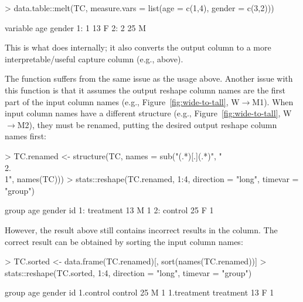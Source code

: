 \begin{Schunk}
\begin{Sinput}
> data.table::melt(TC, measure.vars = list(age = c(1,4), gender = c(3,2)))
\end{Sinput}
\begin{Soutput}
   variable age gender
1:        1  13      F
2:        2  25      M
\end{Soutput}
\end{Schunk}

This is what  does internally; it also converts the
 output column to a more interpretable/useful capture
column (e.g.,  above).

The  function suffers from the same issue as the
 usage above. Another issue with this
function is that it assumes the output reshape column names are the
first part of the input column names
(e.g., Figure~\ref{fig:wide-to-tall}, W$\rightarrow$M1). When input
column names have a different structure
(e.g., Figure~\ref{fig:wide-to-tall}, W$\rightarrow$M2), they must be
renamed, putting the desired output reshape column names first:

\begin{Schunk}
\begin{Sinput}
> TC.renamed <- structure(TC, names = sub("(.*)[.](.*)", "\\2.\\1", names(TC)))
> stats::reshape(TC.renamed, 1:4, direction = "long", timevar = "group")
\end{Sinput}
\begin{Soutput}
       group age gender id
1: treatment  13      M  1
2:   control  25      F  1
\end{Soutput}
\end{Schunk}

However, the result above still contains incorrect results in the
 column. The correct result can be obtained by sorting
the input column names:

\begin{Schunk}
\begin{Sinput}
> TC.sorted <- data.frame(TC.renamed)[, sort(names(TC.renamed))]
> stats::reshape(TC.sorted, 1:4, direction = "long", timevar = "group")
\end{Sinput}
\begin{Soutput}
                group age gender id
1.control     control  25      M  1
1.treatment treatment  13      F  1
\end{Soutput}
\end{Schunk}

